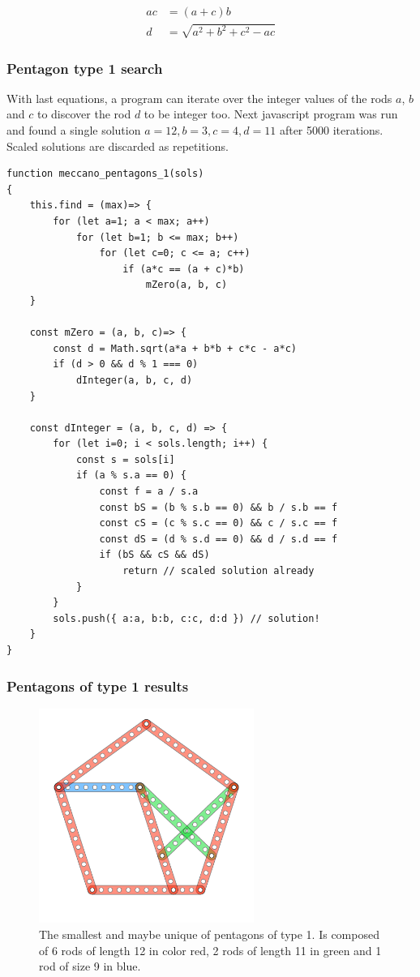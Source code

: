 \documentclass[11pt]{article}
\begin{document}
\begin{align*}
ac &= (a + c)b \\
d &= \sqrt{ a^2 + b^2 + c^2 - ac }
\end{align*}

\subsubsection{Pentagon type 1 search}

With last equations, a program can iterate over the integer values of the rods $a$, $b$ and $c$ to discover the rod $d$ to be integer too. Next javascript program was run and found a single solution $a = 12, b = 3, c = 4, d = 11$ after 5000 iterations. Scaled solutions are discarded as repetitions.

\begin{lstlisting}
function meccano_pentagons_1(sols)
{
	this.find = (max)=> {
		for (let a=1; a < max; a++)
			for (let b=1; b <= max; b++)
				for (let c=0; c <= a; c++)
					if (a*c == (a + c)*b)
						mZero(a, b, c)
	}
	
	const mZero = (a, b, c)=> {
		const d = Math.sqrt(a*a + b*b + c*c - a*c)
		if (d > 0 && d % 1 === 0)
			dInteger(a, b, c, d)
	}

	const dInteger = (a, b, c, d) => {
		for (let i=0; i < sols.length; i++) {
			const s = sols[i]
			if (a % s.a == 0) {
				const f = a / s.a
				const bS = (b % s.b == 0) && b / s.b == f
				const cS = (c % s.c == 0) && c / s.c == f
				const dS = (d % s.d == 0) && d / s.d == f
				if (bS && cS && dS)
					return // scaled solution already
			}
		}
		sols.push({ a:a, b:b, c:c, d:d }) // solution!
	}
}
\end{lstlisting}

\subsubsection{Pentagons of type 1 results}

\begin{figure}
\centering
\includegraphics[width=7cm]{figs/pentagon-12a}
\caption{The smallest and maybe unique of pentagons of type 1. Is composed of 6 rods of
length 12 in color red, 2 rods of length 11 in green and 1 rod of size 9 in blue.}
\label{pentagon-12a}
\end{figure}
\end{document}
